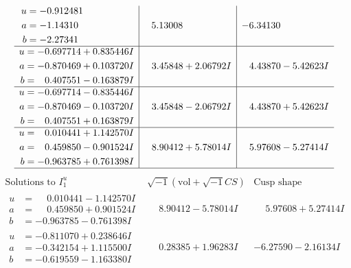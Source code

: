 \documentclass[1p]{elsarticle_modified}
\theoremstyle{definition}
\newcommand{\I}{\sqrt{-1}}
\begin{document}
$$\begin{array}{c|c|c}
\begin{aligned}
u &= -0.912481\phantom{ +0.000000I} \\
a &= -1.14310\phantom{ +0.000000I} \\
b &= -2.27341\phantom{ +0.000000I}\end{aligned}
 & \phantom{-}5.13008\phantom{ +0.000000I} & -6.34130\phantom{ +0.000000I} \\ \hline\begin{aligned}
u &= -0.697714 + 0.835446 I \\
a &= -0.870469 + 0.103720 I \\
b &= \phantom{-}0.407551 - 0.163879 I\end{aligned}
 & \phantom{-}3.45848 + 2.06792 I & \phantom{-}4.43870 - 5.42623 I \\ \hline\begin{aligned}
u &= -0.697714 - 0.835446 I \\
a &= -0.870469 - 0.103720 I \\
b &= \phantom{-}0.407551 + 0.163879 I\end{aligned}
 & \phantom{-}3.45848 - 2.06792 I & \phantom{-}4.43870 + 5.42623 I \\ \hline\begin{aligned}
u &= \phantom{-}0.010441 + 1.142570 I \\
a &= \phantom{-}0.459850 - 0.901524 I \\
b &= -0.963785 + 0.761398 I\end{aligned}
 & \phantom{-}8.90412 + 5.78014 I & \phantom{-}5.97608 - 5.27414 I\\
 \hline 
 \end{array}$$\newpage$$\begin{array}{c|c|c}  
\text{Solutions to }I^u_{1}& \I (\text{vol} + \sqrt{-1}CS) & \text{Cusp shape}\\
 \hline 
\begin{aligned}
u &= \phantom{-}0.010441 - 1.142570 I \\
a &= \phantom{-}0.459850 + 0.901524 I \\
b &= -0.963785 - 0.761398 I\end{aligned}
 & \phantom{-}8.90412 - 5.78014 I & \phantom{-}5.97608 + 5.27414 I \\ \hline\begin{aligned}
u &= -0.811070 + 0.238646 I \\
a &= -0.342154 + 1.115500 I \\
b &= -0.619559 - 1.163380 I\end{aligned}
 & \phantom{-}0.28385 + 1.96283 I & -6.27590 - 2.16134 I \\ \hline\begin{aligned}

\end{aligned}
\end{array}$$
\end{document}
